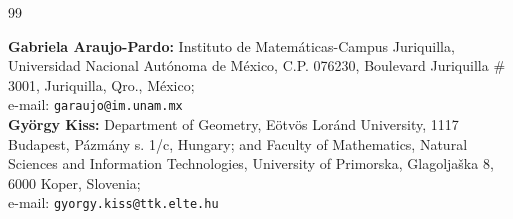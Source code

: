 \documentclass[a4paper,11pt]{article}
\begin{document}
\begin{thebibliography}{99}

















\end{thebibliography}


\noindent
{\bf Gabriela Araujo-Pardo:} 
Instituto de Matem\'aticas-Campus Juriquilla, Universidad Nacional Aut\'onoma de 
M\'exico, C.P. 076230, Boulevard Juriquilla \# 3001, Juriquilla, Qro., M\'exico;  \\
 e-mail:  \texttt{garaujo@im.unam.mx} \\


\noindent
{\bf Gy\"orgy Kiss:} Department of Geometry,  E\"otv\"os Lor\'and University, 1117 Budapest, P\'azm\'any
s. 1/c, Hungary; and Faculty of Mathematics, Natural Sciences and Information Technologies, University of Primorska, Glagolja\v ska 8, 6000 Koper,
Slovenia; \\
e-mail: \texttt{gyorgy.kiss@ttk.elte.hu} \\
\end{document}
